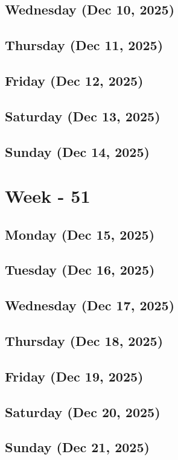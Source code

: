 \subsection*{Wednesday (Dec 10, 2025)}
\subsection*{Thursday (Dec 11, 2025)}
\subsection*{Friday (Dec 12, 2025)}
\subsection*{Saturday (Dec 13, 2025)}
\subsection*{Sunday (Dec 14, 2025)}

\section{Week - 51}
\subsection*{Monday (Dec 15, 2025)}
\subsection*{Tuesday (Dec 16, 2025)}
\subsection*{Wednesday (Dec 17, 2025)}
\subsection*{Thursday (Dec 18, 2025)}
\subsection*{Friday (Dec 19, 2025)}
\subsection*{Saturday (Dec 20, 2025)}
\subsection*{Sunday (Dec 21, 2025)}

